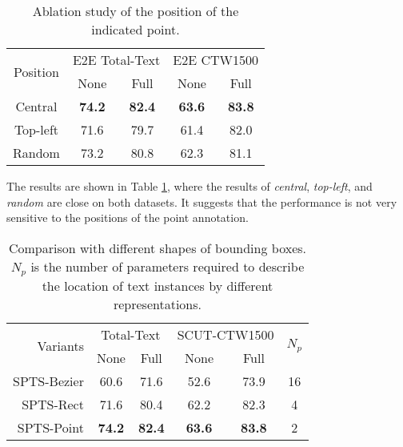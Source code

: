\documentclass[sigconf]{acmart}
\begin{document}
\begin{table}[t!]
    \centering
\caption{Ablation study of the position of the indicated point.}
    \label{tab:ab1_position_point}
    \footnotesize
    \begin{tabular}{c|cc|cc}\hline
    \multirow{2}{*}{Position} & \multicolumn{2}{c|}{E2E Total-Text} & \multicolumn{2}{c}{E2E CTW1500} \\ \cline{2-5} 
     & \multicolumn{1}{c|}{None} & Full & \multicolumn{1}{c|}{None} & \multicolumn{1}{c}{Full} \\ \hline
    Central & \textbf{74.2} & \textbf{82.4} & \textbf{63.6} & \textbf{83.8} \\
    Top-left & 71.6 & 79.7 & 61.4 & 82.0 \\
    Random & 73.2 & 80.8 & 62.3 & 81.1 \\ \hline
    \end{tabular}
\end{table}

The results are shown in Table \ref{tab:ab1_position_point}, where the results of \emph{central}, \emph{top-left}, and \emph{random} are close on both datasets. It suggests that the performance is not very sensitive to the positions of the point annotation.



\begin{table}[t!]
\centering
\caption{Comparison with different shapes of bounding boxes. $N_{p}$ is the number of parameters required to describe the location of text instances by different representations.}
\label{tab:ab_box_shape}
\footnotesize
\begin{tabular}{r|cc|cc|c}
\hline
\multirow{2}{*}{Variants} & \multicolumn{2}{c|}{Total-Text}                   & \multicolumn{2}{c|}{SCUT-CTW1500} &
\multirow{2}{*}{$N_{p}$} \\ \cline{2-5} 
                        & \multicolumn{1}{c|}{None}    & \multicolumn{1}{c|}{Full} 
                        & \multicolumn{1}{c|}{None}    & \multicolumn{1}{c|}{Full}
                        & \\ \hline
SPTS-Bezier& 60.6 & 71.6 & 52.6 & 73.9 & 16 \\ 
SPTS-Rect & 71.6 & 80.4 & 62.2 & 82.3 & 4 \\  SPTS-Point &\textbf{74.2} & \textbf{82.4} & \textbf{63.6} & \textbf{83.8} & 2  \\ \hline
\end{tabular}
\end{table}
\end{document}
